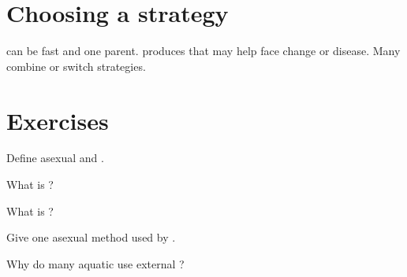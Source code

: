 \section{Choosing a strategy}

\begin{proposition}\label{prop:g6:reproduction:tradeoff}
 can be fast and  one parent.  produces  that may help  face change
or disease. Many  combine or switch strategies.
\end{proposition}
\admitted

\section{Exercises}

\begin{exercise}[$\star$]\label{exo:g6:reproduction:1}
Define asexual and .
\end{exercise}

\begin{exercise}[$\star$]\label{exo:g6:reproduction:2}
What is ?
\end{exercise}

\begin{exercise}[$\star$]\label{exo:g6:reproduction:3}
What is ?
\end{exercise}

\begin{exercise}[$\star$]\label{exo:g6:reproduction:4}
Give one asexual method used by .
\end{exercise}

\begin{exercise}[$\star\star$]\label{exo:g6:reproduction:5}
Why do many aquatic  use external ?
\end{exercise}

